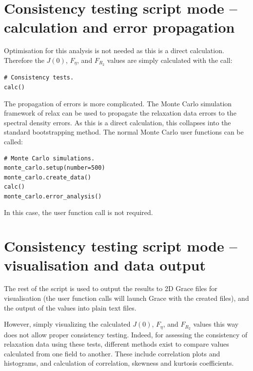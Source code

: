 
\section{Consistency testing script mode -- calculation and error propagation}

Optimisation for this analysis is not needed as this is a direct calculation.  Therefore the $J(0)$, $F_\eta$, and $F_{R_2}$ values are simply calculated with the call:

\begin{lstlisting}[firstnumber=65]
# Consistency tests.
calc()
\end{lstlisting}

The propagation of errors is more complicated.  The Monte Carlo simulation framework of relax can be used to propagate the relaxation data errors to the spectral density errors.  As this is a direct calculation, this collapses into the standard bootstrapping method.  The normal Monte Carlo user functions can be called:

\begin{lstlisting}[firstnumber=68]
# Monte Carlo simulations.
monte_carlo.setup(number=500)
monte_carlo.create_data()
calc()
monte_carlo.error_analysis()
\end{lstlisting}

In this case, the  user function call is not required.



\section{Consistency testing script mode -- visualisation and data output}
\label{sec: Visualisation and data output}

The rest of the script is used to output the results to 2D Grace files for visualisation (the  user function calls will launch Grace with the created files), and the output of the values into plain text files.

However, simply visualizing the calculated $J(0)$, $F_\eta$, and $F_{R_2}$ values this way does not allow proper consistency testing. Indeed, for assessing the consistency of relaxation data using these tests, different methods exist to compare values calculated from one field to another.  These include correlation plots and histograms, and calculation of correlation, skewness and kurtosis coefficients.

